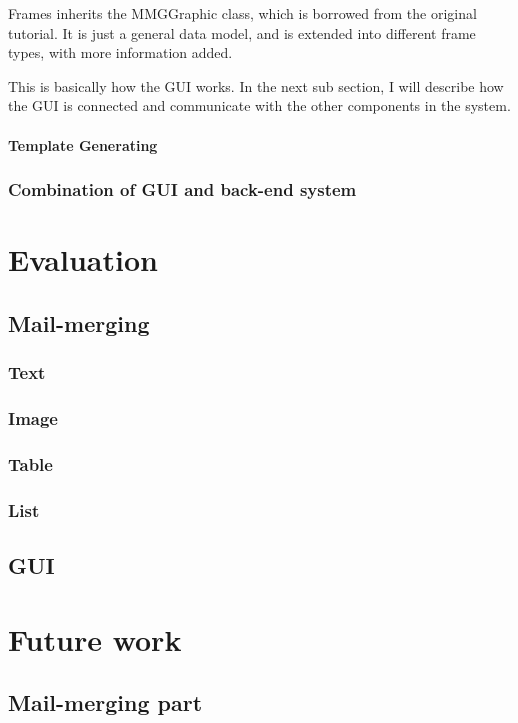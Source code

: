 \documentclass[12pt,twoside,a4paper]{report}
\begin{document}
  Frames inherits the MMGGraphic class, which is borrowed from the original tutorial. It is just a general data model, and is extended into different frame types, with more information added.

  This is basically how the GUI works. In the next sub section, I will describe how the GUI is connected and communicate with the other components in the system.

\subsubsection{Template Generating}
 
  

\subsection{Combination of GUI and back-end system}

\chapter{Evaluation}
\section{Mail-merging}
\subsection{Text}
\subsection{Image}
\subsection{Table}
\subsection{List}
\section{GUI}

\chapter{Future work}
\section{Mail-merging part}
\end{document}
